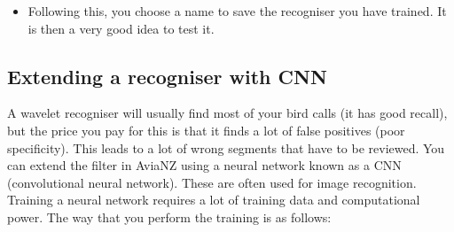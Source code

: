 \documentclass{article}
\begin{document}
\begin{itemize}



\item Following this, you choose a name to save the recogniser you have trained. It is then a very good idea to test it. 
\end{itemize}

\subsection{Extending a recogniser with CNN}\label{sec:cnnfilter}

A wavelet recogniser will usually find most of your bird calls (it has good recall), but the price you pay for this is that it finds a lot of false positives (poor specificity). This leads to a lot of wrong segments that have to be reviewed. You can extend the filter in AviaNZ using a neural network known as a CNN (convolutional neural network). These are often used for image recognition. Training a neural network requires a lot of training data and computational power. The way that you perform the training is as follows:
\end{document}
